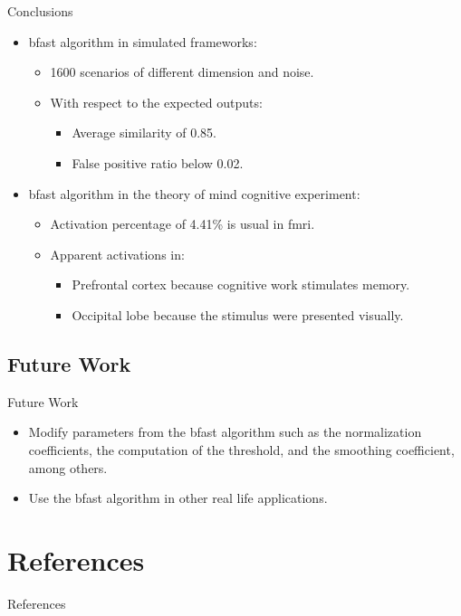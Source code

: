 \documentclass{beamer}
\begin{document}
\begin{frame}{Conclusions}
\begin{itemize}
\item \gls{bfast} algorithm in simulated frameworks:
\begin{itemize}
\item 1600 scenarios of different dimension and noise.
\item With respect to the expected outputs:
\begin{itemize}
\item Average similarity of 0.85.
\item False positive ratio below 0.02.
\end{itemize}
\end{itemize}
\item \gls{bfast} algorithm in the theory of mind cognitive experiment:
\begin{itemize}
\item Activation percentage of 4.41\% is usual in \gls{fmri}.
\item Apparent activations in:
\begin{itemize}
\item Prefrontal cortex because cognitive work stimulates memory.
\item Occipital lobe because the stimulus were presented visually.
\end{itemize}
\end{itemize}
\end{itemize}
\end{frame}

\subsection{Future Work}

\begin{frame}{Future Work}
\begin{itemize}
\item Modify parameters from the \gls{bfast} algorithm such as the 
normalization coefficients, the computation of the threshold, and the 
smoothing coefficient, among others.
\item Use the \gls{bfast} algorithm in other real life applications.
\end{itemize}
\end{frame}

\section{References}

\begin{frame}[allowframebreaks]{References}

\end{frame}


\begin{frame}
\end{frame}

\end{document}
